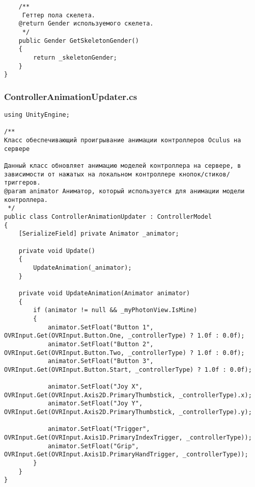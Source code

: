 \begin{verbatim}
    /**
     Геттер пола скелета.
    @return Gender используемого скелета.
     */
    public Gender GetSkeletonGender()
    {
        return _skeletonGender;
    }
}

\end{verbatim}
\subsubsection*{ControllerAnimationUpdater.cs}
\begin{verbatim}
﻿using UnityEngine;

/**
Класс обеспечивающий проигрывание анимации контроллеров Oculus на сервере

Данный класс обновляет анимацию моделей контроллера на сервере, в зависимости от нажатых на локальном контроллере кнопок/стиков/триггеров.
@param animator Аниматор, который используется для анимации модели контроллера.
 */
public class ControllerAnimationUpdater : ControllerModel
{
    [SerializeField] private Animator _animator;

    private void Update()
    {
        UpdateAnimation(_animator);
    }

    private void UpdateAnimation(Animator animator)
    {
        if (animator != null && _myPhotonView.IsMine)
        {
            animator.SetFloat("Button 1", OVRInput.Get(OVRInput.Button.One, _controllerType) ? 1.0f : 0.0f);
            animator.SetFloat("Button 2", OVRInput.Get(OVRInput.Button.Two, _controllerType) ? 1.0f : 0.0f);
            animator.SetFloat("Button 3", OVRInput.Get(OVRInput.Button.Start, _controllerType) ? 1.0f : 0.0f);

            animator.SetFloat("Joy X", OVRInput.Get(OVRInput.Axis2D.PrimaryThumbstick, _controllerType).x);
            animator.SetFloat("Joy Y", OVRInput.Get(OVRInput.Axis2D.PrimaryThumbstick, _controllerType).y);

            animator.SetFloat("Trigger", OVRInput.Get(OVRInput.Axis1D.PrimaryIndexTrigger, _controllerType));
            animator.SetFloat("Grip", OVRInput.Get(OVRInput.Axis1D.PrimaryHandTrigger, _controllerType));
        }
    }
}

\end{verbatim}
